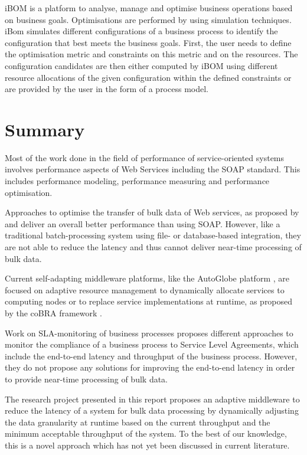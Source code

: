 iBOM \citep{Castellanos:2005fk} is a platform to analyse, manage and optimise business operations based on business goals. Optimisations are performed by using simulation techniques. iBom simulates different configurations of a business process to identify the configuration that best meets the business goals. First, the user needs to define the optimisation metric and constraints on this metric and on the resources. The configuration candidates are then either computed by iBOM using different resource allocations of the given configuration within the defined constraints or are provided by the user in the form of a process model. 

\section{Summary}
Most of the work done in the field of performance of service-oriented systems involves performance aspects of Web Services including the SOAP standard. This includes performance modeling, performance measuring and performance optimisation. 

Approaches to optimise the transfer of bulk data of Web services, as proposed by \citet{Wichaiwong:2007oq} and  \citet{Habich:2007ij} deliver an overall better performance than using SOAP. However, like a traditional batch-processing system using file- or database-based integration, they are not able to reduce the latency and thus cannot deliver near-time processing of bulk data.

Current self-adapting middleware platforms, like the AutoGlobe platform \citep{Gmach:2008vo}, are focused on adaptive resource management to dynamically allocate services to computing nodes or to replace service implementations at runtime, as proposed by the coBRA framework \citep{Irmert:2008nx}.

Work on SLA-monitoring of business processes proposes different approaches to monitor the compliance of a business process to Service Level Agreements, which include the end-to-end latency and throughput of the business process. However, they do not propose any solutions for improving the end-to-end latency in order to provide near-time processing of bulk data.

The research project presented in this report proposes an adaptive middleware to reduce the latency of a system for bulk data processing by dynamically adjusting the data granularity at runtime based on the current throughput and the minimum acceptable throughput of the system. To the best of our knowledge, this is a novel approach which has not yet been discussed in current literature.